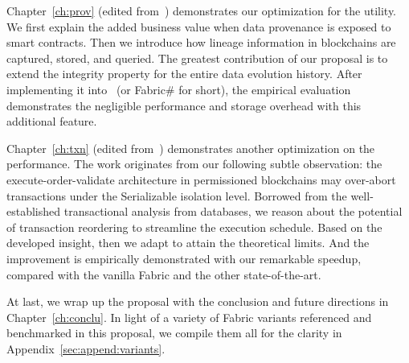 Chapter~\ref{ch:prov} (edited from~\cite{ruan2019fine}) demonstrates our optimization for the utility. 
We first explain the added business value when data provenance is exposed to smart contracts. 
Then we introduce how lineage information in blockchains are captured, stored, and queried. 
The greatest contribution of our proposal is to extend the integrity property for the entire data evolution history. 
After implementing it into {\fs}~(or Fabric\# for short), the empirical evaluation demonstrates the negligible performance and storage overhead with this additional feature. 

Chapter~\ref{ch:txn} (edited from~\cite{ruan2020transactional}) demonstrates another optimization on the performance. 
The work originates from our following subtle observation:
the execute-order-validate architecture in permissioned blockchains may over-abort transactions under the Serializable isolation level. 
Borrowed from the well-established transactional analysis from databases, we reason about the potential of transaction reordering to streamline the execution schedule. Based on the developed insight, then we adapt {\fs} to attain the theoretical limits. 
And the improvement is empirically demonstrated with our remarkable speedup, compared with the vanilla Fabric and the other state-of-the-art. 

At last, we wrap up the proposal with the conclusion and future directions in Chapter~\ref{ch:conclu}. 
In light of a variety of Fabric variants referenced and benchmarked in this proposal, we compile them all for the clarity in Appendix~\ref{sec:append:variants}. 

